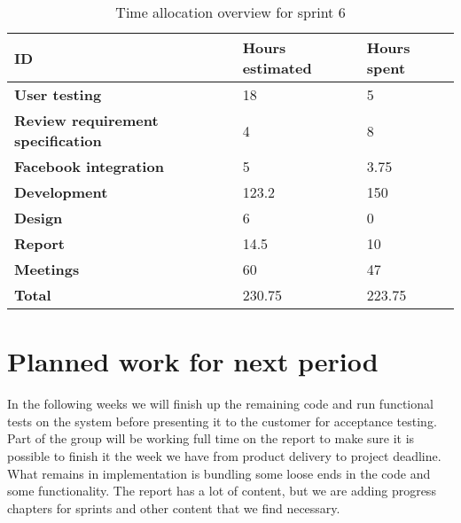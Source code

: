 \documentclass[12pt]{article}
\begin{document}
\begin{table}[H]
\label{tab:timealloc}
    \centering
    \begin{tabular}{|l|l|l|}%
    \hline 
    \textbf{ID} & \textbf{Hours estimated} & \textbf{Hours spent}\\\hline
    \textbf{User testing} &18&5\\\hline
\textbf{Review requirement specification} & 4 &8 \\\hline
\textbf{Facebook integration}&5&3.75\\\hline


\textbf{Development} &123.2& 150\\\hline

\textbf{Design}&6&0\\\hline
\textbf{Report}&14.5 &10 \\\hline
\textbf{Meetings} &60&47\\\hline
\textbf{Total} & 230.75&223.75 \\\hline
    \end{tabular}
    \caption{Time allocation overview for sprint 6}

\end{table}


\section{Planned work for next period}
In the following weeks we will finish up the remaining code and run functional tests on the system before presenting it to the customer for acceptance testing. Part of the group will be working full time on the report to make sure it is possible to finish it the week we have from product delivery to project deadline. What remains in implementation is bundling some loose ends in the code and some functionality. The report has a lot of content, but we are adding progress chapters for sprints and other content that we find necessary. 
\end{document}
